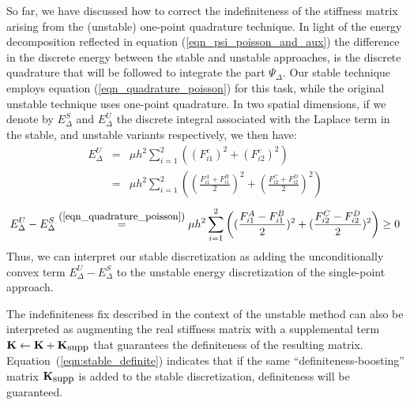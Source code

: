 So far, we have discussed how to correct the indefiniteness of the stiffness matrix arising from the (unstable) one-point quadrature technique. In light of the energy decomposition reflected
in equation (\ref{eqn_psi_poisson_and_aux}) the difference in the discrete energy between the stable and unstable approaches, is the discrete quadrature that will be followed to
integrate the part $\Psi_\Delta$. Our stable technique employs equation (\ref{eqn_quadrature_poisson}) for this task, while the original unstable technique uses one-point
quadrature. In two spatial dimensions, if we denote by $E_\Delta^S$ and $E_\Delta^U$ the discrete integral associated with the Laplace term in the stable, and unstable variants
respectively, we then have:
\begin{eqnarray*}
E_\Delta^U&=&\mu h^2\sum_{i=1}^2\left((F_{i1}^e)^2+(F_{i2}^e)^2\right)\\
&=&\mu h^2\sum_{i=1}^2\left((\frac{F_{i1}^A+F_{i1}^B}{2})^2+(\frac{F_{i2}^C+F_{i2}^D}{2})^2\right)
\end{eqnarray*}
\begin{equation}\label{eqn:stable_definite}
E_\Delta^U-E_\Delta^S\stackrel{\mbox{\small(\ref{eqn_quadrature_poisson})}}{=}\mu h^2\sum_{i=1}^2\left((\frac{F_{i1}^A-F_{i1}^B}{2})^2+(\frac{F_{i2}^C-F_{i2}^D}{2})^2\right)\geq 0
\end{equation}
Thus, we can interpret our stable discretization as adding the unconditionally convex term $E_\Delta^U-E_\Delta^S$ to the unstable energy discretization of the single-point
approach. 

The indefiniteness fix described in the context of the unstable method can also be interpreted as augmenting the real stiffness matrix with a supplemental term
$\mathbf{K}\gets\mathbf{K}+\mathbf{K}_{\mbox{\small supp}}$ that guarantees the definiteness of the resulting matrix.  Equation~(\ref{eqn:stable_definite})  indicates that if the same
``definiteness-boosting'' matrix $\mathbf{K}_{\mbox{\small supp}}$ is added to the stable discretization, definiteness will be guaranteed. 


